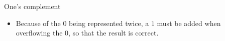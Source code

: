 \begin{vbframe}{One's complement}
\vspace{-0.5cm}
\begin{itemize}
  \item Because of the $0$ being represented twice, a $1$ must be added when overflowing the $0$, so that the result is correct.
\end{itemize}

%
%
%
%
%
%

%
%
%
%

\end{vbframe}

